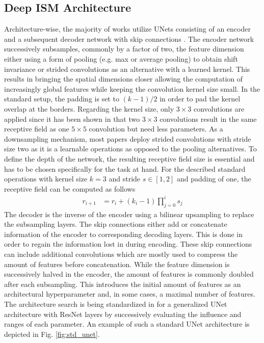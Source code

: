 \subsection{Deep ISM Architecture}
\label{subsec:architecture}
Architecture-wise, the majority of works utilize UNets \cite{ronneberger2015u} consisting of an encoder and a subsequent decoder network with skip connections \cite{prophet2019semantic,sless2019road,wirges2018evidential,weston2019probably,schulter2018learning,lu2019monocular,mani2020monolayout}. The encoder network successively subsamples, commonly by a factor of two, the feature dimension either using a form of pooling (e.g. max or average pooling) to obtain shift invariance or strided convolutions as an alternative with a learned kernel. This results in bringing the spatial dimensions closer allowing the computation of increasingly global features while keeping the convolution kernel size small. In the standard setup, the padding is set to $(k-1)/2$ in order to pad the kernel overlap at the borders. Regarding the kernel size, only $3\times 3$ convolutions are applied since it has been shown in \cite{simonyan2014very} that two $3\times 3$ convolutions result in the same receptive field as one $5 \times 5$ convolution but need less parameters. As a downsampling mechanism, most papers deploy strided convolutions with stride size two as it is a learnable operations as opposed to the pooling alternatives. To define the depth of the network, the resulting receptive field size is essential and has to be chosen specifically for the task at hand. For the described standard operations with kernel size $k=3$ and stride $s \in [1,2]$ and padding of one, the receptive field can be computed as follows
\begin{align}
	\label{eq:receptive_field}
	r_{i+1} &= r_i + (k_i-1)\prod_{j=0}^{i}s_j
\end{align}
The decoder is the inverse of the encoder using a bilinear upsampling \cite{odena2016deconvolution} to replace the subsampling layers. The skip connections either add or concatenate information of the encoder to corresponding decoding layers. This is done in order to regain the information lost in during encoding. These skip connections can include additional convolutions which are mostly used to compress the amount of features before concatenation. While the feature dimension is successively halved in the encoder, the amount of features is commonly doubled after each subsampling. This introduces the initial amount of features as an architectural hyperparameter and, in some cases, a maximal number of features. The architecture search is being standardized in \cite{radosavovic2020designing} for a generalized UNet architecture with ResNet layers by successively evaluating the influence and ranges of each parameter. An example of such a standard UNet architecture is depicted in Fig. \ref{fig:std_unet}.
